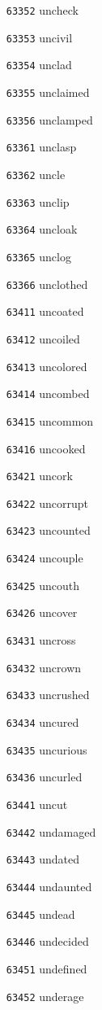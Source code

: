 \documentclass[twoside,11pt]{article}
\begin{document}
\begin{multicols}{5}
\begin{enumerate}
\item[\texttt{63352}] uncheck
\item[\texttt{63353}] uncivil
\item[\texttt{63354}] unclad
\item[\texttt{63355}] unclaimed
\item[\texttt{63356}] unclamped
\item[\texttt{63361}] unclasp
\item[\texttt{63362}] uncle
\item[\texttt{63363}] unclip
\item[\texttt{63364}] uncloak
\item[\texttt{63365}] unclog
\item[\texttt{63366}] unclothed
\item[\texttt{63411}] uncoated
\item[\texttt{63412}] uncoiled
\item[\texttt{63413}] uncolored
\item[\texttt{63414}] uncombed
\item[\texttt{63415}] uncommon
\item[\texttt{63416}] uncooked
\item[\texttt{63421}] uncork
\item[\texttt{63422}] uncorrupt
\item[\texttt{63423}] uncounted
\item[\texttt{63424}] uncouple
\item[\texttt{63425}] uncouth
\item[\texttt{63426}] uncover
\item[\texttt{63431}] uncross
\item[\texttt{63432}] uncrown
\item[\texttt{63433}] uncrushed
\item[\texttt{63434}] uncured
\item[\texttt{63435}] uncurious
\item[\texttt{63436}] uncurled
\item[\texttt{63441}] uncut
\item[\texttt{63442}] undamaged
\item[\texttt{63443}] undated
\item[\texttt{63444}] undaunted
\item[\texttt{63445}] undead
\item[\texttt{63446}] undecided
\item[\texttt{63451}] undefined
\item[\texttt{63452}] underage

\end{enumerate}
\end{multicols}
\end{document}
